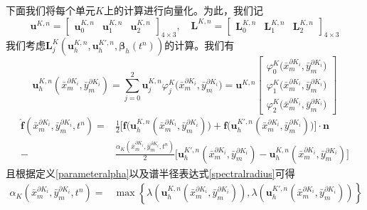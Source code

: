 \documentclass[a4paper, 12pt, UTF8]{ctexart}
\newcommand{\bs}[1]{\boldsymbol{#1}}
\begin{document}
下面我们将每个单元$K$上的计算进行向量化。为此，我们记
\begin{equation}
\bs u^{K,n}=\begin{bmatrix}
\bs u_0^{K,n} & \bs u_1^{K,n} & \bs u_2^{K,n}
\end{bmatrix}_{4\times 3},\quad \bs L^{K,n}=\begin{bmatrix}
\bs L_0^{K,n} &\bs L_1^{K,n} &\bs L_2^{K,n}
\end{bmatrix}_{4\times 3}
\end{equation}
我们考虑$\bs L_{j}^K\left(\bs u_{h}^{K, n}, \bs u_{h}^{K', n},\bs \beta_{h}\left(t^{n}\right)\right)$的计算。我们有
\begin{equation}
\bs u_{h}^{K,n}\left(\bar{x}_{m}^{\partial K_i}, \bar{y}_{m}^{\partial K_i}\right)=\sum\limits_{j=0}^2\bs u_j^{K,n}\varphi_j^K\big(\bar{x}_{m}^{\partial K_i}, \bar{y}_{m}^{\partial K_i}\big)=\bs u^{K,n}\begin{bmatrix}
\varphi_0^K\big(\bar{x}_{m}^{\partial K_i}, \bar{y}_{m}^{\partial K_i}\big)\\
\varphi_1^K\big(\bar{x}_{m}^{\partial K_i}, \bar{y}_{m}^{\partial K_i}\big)\\
\varphi_2^K\big(\bar{x}_{m}^{\partial K_i}, \bar{y}_{m}^{\partial K_i}\big)
\end{bmatrix}
\end{equation}
\begin{equation}
\begin{split}
\hat{\bs f}\left(\bar{x}_{m}^{\partial K_i}, \bar{y}_{m}^{\partial K_i}, t^n\right)=&\frac{1}{2}\Big[\bs f\big({\bs u_{h}^{K,n}\left(\bar{x}_{m}^{\partial K_i}, \bar{y}_{m}^{\partial K_i}\right)}\big)+\bs f\big({\bs u_{h}^{K',n}\left(\bar{x}_{m}^{\partial K_i}, \bar{y}_{m}^{\partial K_i}\right)}\big) \Big]\cdot \bs{n}\\
-&\frac{\alpha_{K}(\bar{x}_{m}^{\partial K_i}, \bar{y}_{m}^{\partial K_i}, t^n)}{2}\Big[{\bs u_{h}^{K',n}\left(\bar{x}_{m}^{\partial K_i}, \bar{y}_{m}^{\partial K_i}\right)}-{\bs u_{h}^{K,n}\left(\bar{x}_{m}^{\partial K_i}, \bar{y}_{m}^{\partial K_i}\right)}\Big]
\end{split}
\end{equation}
且根据定义\eqref{parameteralpha}以及谱半径表达式\eqref{spectralradius}可得
\begin{equation}
\begin{split}
\alpha_{K}(\bar{x}_{m}^{\partial K_i}, \bar{y}_{m}^{\partial K_i},t^n)=&\max \left\{\lambda\left(\bs u_{h}^{K,n}(\bar{x}_{m}^{\partial K_i}, \bar{y}_{m}^{\partial K_i})\right), \lambda\left(\bs u_h^{K', n}(\bar{x}_{m}^{\partial K_i}, \bar{y}_{m}^{\partial K_i})\right)\right\}
\end{split}
\end{equation}
\end{document}

